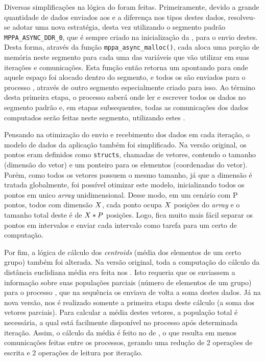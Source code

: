 Diversas simplificações na lógica do  \KM foram feitas. Primeiramente, devido a grande quantidade de dados enviados aos \CCs e a diferença nos tipos destes dados, resolveu-se adotar uma nova estratégia, desta vez utilizando o segmento padrão \texttt{MPPA\_ASYNC\_DDR\_0}, que é sempre criado na inicialização da \ASYNC, para o envio destes. Desta forma, através da função \texttt{mppa\_async\_malloc()}, cada \slave aloca uma porção de memória neste segmento para cada uma das variáveis que vão utilizar em suas iterações e comunicações. Esta função então retorna um \offset apontando para onde aquele espaço foi alocado dentro do segmento, e todos os \offsets são enviados para o processo \master, através de outro segmento especialmente criado para isso. Ao término desta primeira etapa, o processo \master saberá onde ler e escrever todos os dados no segmento padrão e, em etapas subsequentes, todas as comunicações dos dados computados serão feitas neste segmento, utilizando estes \offsets.

Pensando na otimização do envio e recebimento dos dados em cada iteração, o modelo de dados da aplicação também foi simplificado. Na versão original, os pontos eram definidos como \texttt{structs}, chamadas de vetores, contendo o tamanho (dimensão do vetor) e um ponteiro para os elementos (coordenadas do vetor). Porém, como todos os vetores possuem o mesmo tamanho, já que a dimensão é tratada globalmente, foi possível otimizar este modelo, inicializando todos os pontos em unico \textit{array} unidimensional. Desse modo, em um cenário com P pontos, todos com dimensão $\mathnormal{X}$, cada ponto ocupa $\mathnormal{X}$ posições do \textit{array} e o tamanho total deste é de $\mathnormal{X * P}$ posições. Logo, fica muito mais fácil separar os pontos em intervalos e enviar cada intervalo como tarefa para um certo \cluster de computação.

Por fim, a lógica de cálculo dos \textit{centroids} (média dos elementos de um certo grupo) também foi alterada. Na versão original, toda a computação do cálculo da distância euclidiana média era feita nos \CCs. Isto requeria que os \CCs enviassem a informação sobre suas populações parciais (número de elementos de um grupo) para o processo \master, que na sequência os enviava de volta a soma destes dados. Já na nova versão, nos \CCs é realizado somente a primeira etapa deste cálculo (a soma dos vetores parciais). Para calcular a média destes vetores, a população total é necessária, a qual está facilmente disponível no processo \master após determinada iteração. Assim, o cálculo da média é feito no \cluster de \IO, o que resulta em menos comunicações feitas entre os processos, gerando uma redução de 2 operações de escrita e 2 operações de leitura por iteração.

